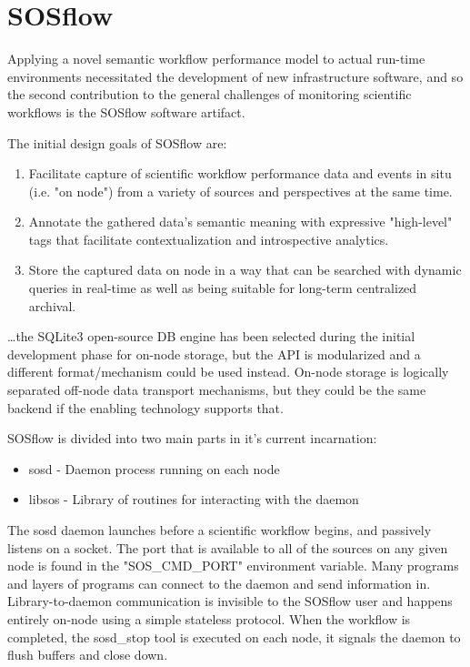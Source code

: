 \section{SOSflow}
Applying a novel semantic workflow performance model to actual
run-time environments necessitated the development of new
infrastructure software, and so the second contribution to the general
challenges of monitoring scientific workflows is the SOSflow software
artifact.

The initial design goals of SOSflow are:

\begin{enumerate}
\item Facilitate capture of scientific workflow performance data and
  events in situ (i.e. "on node") from a variety of sources and
  perspectives at the same time.
\item Annotate the gathered data's semantic meaning with expressive
  "high-level" tags that facilitate contextualization and
  introspective analytics.
\item Store the captured data on node in a way that can be searched
  with dynamic queries in real-time as well as being suitable for
  long-term centralized archival.
\end{enumerate}

\ldots the SQLite3 open-source DB engine has been selected during the
initial development phase for on-node storage, but the API is
modularized and a different format/mechanism could be used instead.
On-node storage is logically separated off-node data transport
mechanisms, but they could be the same backend if the enabling
technology supports that.

SOSflow is divided into two main parts in it's current incarnation:

\begin{itemize}
\item sosd - Daemon process running on each node
\item libsos - Library of routines for interacting with the daemon
\end{itemize}

The sosd daemon launches before a scientific workflow begins, and
passively listens on a socket.  The port that is available to all of
the sources on any given node is found in the "SOS\_CMD\_PORT"
environment variable.  Many programs and layers of programs can
connect to the daemon and send information in. Library-to-daemon
communication is invisible to the SOSflow user and happens entirely
on-node using a simple stateless protocol.  When the workflow is
completed, the sosd\_stop tool is executed on each node, it signals
the daemon to flush buffers and close down.

